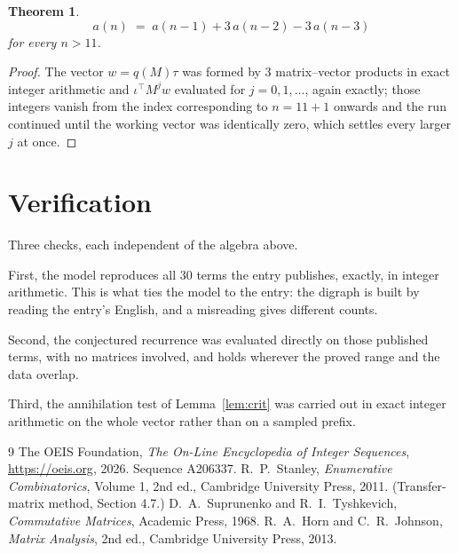 \documentclass[11pt,a4paper]{article}
\theoremstyle{plain}
\newtheorem{theorem}{Theorem}
\theoremstyle{definition}
\begin{document}
\begin{theorem}
\[
a(n)\;=\;a(n-1) + 3\,a(n-2) - 3\,a(n-3)
\]
for every $n>11$.
\end{theorem}

\begin{proof}
The vector $w=q(M)\tau$ was formed by $3$ matrix--vector products in exact integer
arithmetic and $\iota^{\!\top}M^{j}w$ evaluated for $j=0,1,\dots$, again exactly; those
integers vanish from the index corresponding to $n=11+1$ onwards and the run continued
until the working vector was identically zero, which settles every larger $j$ at once.
\end{proof}

\section{Verification}

Three checks, each independent of the algebra above.

First, the model reproduces all $30$ terms the entry publishes, exactly, in integer
arithmetic. This is what ties the model to the entry: the digraph is built by reading the
entry's English, and a misreading gives different counts.

Second, the conjectured recurrence was evaluated directly on those published terms, with no
matrices involved, and holds wherever the proved range and the data overlap.

Third, the annihilation test of Lemma~\ref{lem:crit} was carried out in exact integer
arithmetic on the whole vector rather than on a sampled prefix.

\begin{thebibliography}{9}
 The OEIS Foundation, \emph{The On-Line Encyclopedia of Integer
Sequences}, \url{https://oeis.org}, 2026. Sequence A206337.
 R.~P.~Stanley, \emph{Enumerative Combinatorics}, Volume 1, 2nd ed.,
Cambridge University Press, 2011. (Transfer-matrix method, Section 4.7.)
 D.~A.~Suprunenko and R.~I.~Tyshkevich, \emph{Commutative Matrices},
Academic Press, 1968.
 R.~A.~Horn and C.~R.~Johnson, \emph{Matrix Analysis}, 2nd ed., Cambridge
University Press, 2013.
\end{thebibliography}
\end{document}
